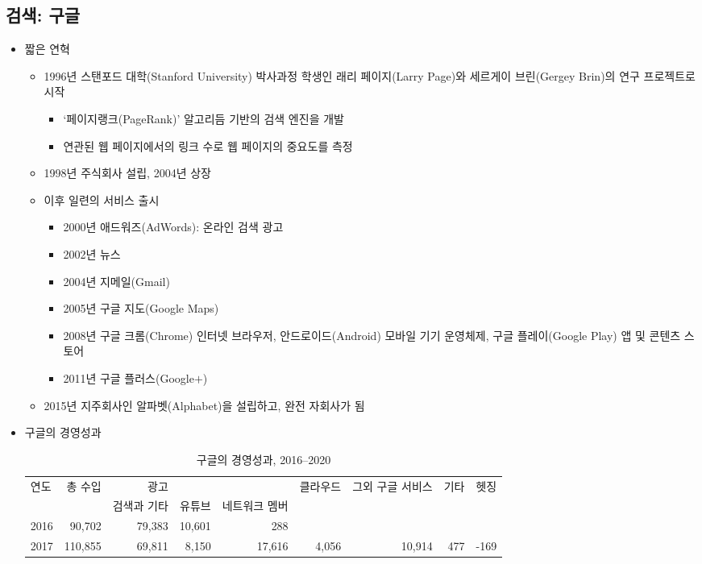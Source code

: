 \subsection{검색: 구글}
\begin{itemize}
\item 짧은 연혁
	\begin{itemize}
	\item 1996년 스탠포드 대학(Stanford University) 박사과정 학생인 래리 페이지(Larry Page)와 세르게이 브린(Gergey Brin)의 연구 프로젝트로 시작
		\begin{itemize}
		\item `페이지랭크(PageRank)' 알고리듬 기반의 검색 엔진을 개발
		\item 연관된 웹 페이지에서의 링크 수로 웹 페이지의 중요도를 측정
		\end{itemize}
	\item 1998년 주식회사 설립, 2004년 상장
	\item 이후 일련의 서비스 출시
		\begin{itemize}
		\item 2000년 애드워즈(AdWords): 온라인 검색 광고
		\item 2002년 뉴스
		\item 2004년 지메일(Gmail)
		\item 2005년 구글 지도(Google Maps)
		\item 2008년 구글 크롬(Chrome) 인터넷 브라우저, 안드로이드(Android) 모바일 기기 운영체제, 구글 플레이(Google Play) 앱 및 콘텐츠 스토어
		\item 2011년 구글 플러스(Google$+$)		
		\end{itemize}
	\item 2015년 지주회사인 알파벳(Alphabet)을 설립하고, 완전 자회사가 됨
	\end{itemize}
\item 구글의 경영성과
			\begin{table}[htp]
			\begin{center}
			\begin{threeparttable}
			\caption{구글의 경영성과, 2016--2020}\label{tab:google}
			\begin{tabularx}{\textwidth}{lrrrrrrrr}
			\toprule
			연도 & 총 수입 & 광고   &  &   & 클라우드 & 그외 구글 서비스 & 기타  & 헷징\\
			& & 검색과 기타 & 유튜브  & 네트워크 멤버 & &  & & \\
			\midrule
			2016 & 90,702 & 79,383 & 10,601 & 288 \\
			2017 & 110,855 & 69,811 & 8,150 & 17,616 & 4,056 & 10,914 & 477  & -169\\

\end{tabularx}
\end{threeparttable}
\end{center}
\end{table}
\end{itemize}
